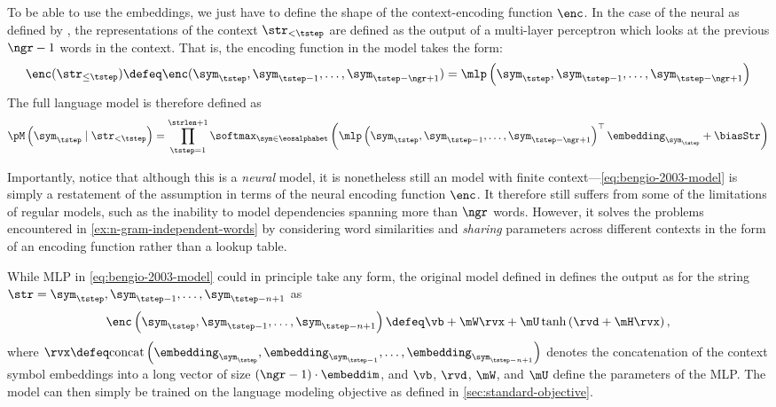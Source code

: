 To be able to use the embeddings, we just have to define the shape of the context-encoding function $\enc$.
In the case of the neural \ngram{} as defined by \citep{Bengio2003}, the representations of the context $\str_{<\tstep}$ are defined as the output of a multi-layer perceptron which looks at the previous $\ngr - 1$ words in the context.
That is, the encoding function in the model takes the form:
\begin{equation}\label{eq:bengio-2003-model}
\enc(\str_{\leq \tstep}) \defeq \enc(\sym_\tstep, \sym_{\tstep-1}, \ldots, \sym_{\tstep-\ngr+1}) = \mlp\left(\sym_\tstep, \sym_{\tstep-1}, \ldots, \sym_{\tstep-\ngr+1}\right)
\end{equation}
The full language model is therefore defined as 
\begin{equation}
    \pM\left(\sym_\tstep \mid \str_{< \tstep}\right) = \prod_{\tstep = 1}^{\strlen + 1} \softmax_{\sym \in \eosalphabet}\left(\mlp\left(\sym_\tstep, \sym_{\tstep-1}, \ldots, \sym_{\tstep-\ngr+1}\right)^\top \embedding_{\sym_\tstep} + \biasStr \right)
\end{equation}

Importantly, notice that although this is a \emph{neural} model, it is nonetheless still an \ngram{} model with finite context---\cref{eq:bengio-2003-model} is simply a restatement of the \ngram{} assumption in terms of the neural encoding function $\enc$.
It therefore still suffers from some of the limitations of regular \ngram{} models, such as the inability to model dependencies spanning more than $\ngr$ words.
However, it solves the problems encountered in \cref{ex:n-gram-independent-words} by considering word similarities and \emph{sharing} parameters across different contexts in the form of an encoding function rather than a lookup table.

While MLP in \cref{eq:bengio-2003-model} could in principle take any form, the original model defined in \citet{Bengio2003} defines the output as for the string $\str = \sym_\tstep, \sym_{\tstep-1}, \ldots, \sym_{\tstep-n+1}$ as 
\begin{equation} \label{eq:bengio-2003-equation}
    \enc\left(\sym_\tstep, \sym_{\tstep-1}, \ldots, \sym_{\tstep-n+1}\right) \defeq \vb + \mW \rvx + \mU \tanh\left(\rvd + \mH \rvx\right),
\end{equation}
where $\rvx \defeq \text{concat}\left(\embedding_{\sym_\tstep}, \embedding_{\sym_{\tstep-1}}, \ldots, \embedding_{\sym_{\tstep-n+1}}\right)$ denotes the concatenation of the context symbol embeddings into a long vector of size $\left(\ngr - 1\right)\cdot \embeddim$, and $\vb$, $\rvd$, $\mW$, and $\mU$ define the parameters of the MLP.
The model can then simply be trained on the language modeling objective as defined in \cref{sec:standard-objective}.

